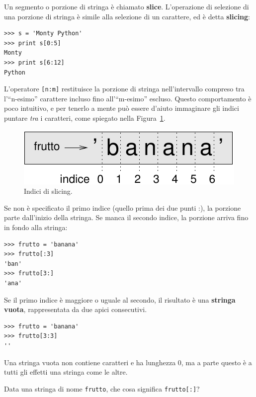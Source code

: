 \documentclass[10pt]{book}
\begin{document}
Un segmento o porzione di stringa è chiamato {\bf slice}. L'operazione di selezione di una porzione di stringa è simile alla selezione di un carattere, ed è detta {\bf slicing}:

\begin{verbatim}
>>> s = 'Monty Python'
>>> print s[0:5]
Monty
>>> print s[6:12]
Python
\end{verbatim}
%
L'operatore {\tt [n:m]} restituisce la porzione di stringa nell'intervallo compreso tra l'``n-esimo'' carattere incluso fino all'``m-esimo'' escluso. Questo comportamento è poco intuitivo, e per tenerlo a mente può essere d'aiuto immaginare gli indici puntare {\em tra} i caratteri, come spiegato nella Figura~\ref{fig.banana}.

\begin{figure}
\centerline
{\includegraphics[scale=0.8]{figs/banana.pdf}}
\caption{Indici di slicing.}
\label{fig.banana}
\end{figure}


Se non è specificato il primo indice (quello prima dei due punti :), la porzione parte dall'inizio della stringa. Se manca il secondo indice, la porzione arriva fino in fondo alla stringa:

\begin{verbatim}
>>> frutto = 'banana'
>>> frutto[:3]
'ban'
>>> frutto[3:]
'ana'
\end{verbatim}
%
Se il primo indice è maggiore o uguale al secondo, il risultato è una {\bf stringa vuota}, rappresentata da due apici consecutivi.

\begin{verbatim}
>>> frutto = 'banana'
>>> frutto[3:3]
''
\end{verbatim}
%
Una stringa vuota non contiene caratteri e ha lunghezza 0, ma a parte questo è a tutti gli effetti una stringa come le altre.

\vspace{0.2in}
\begin{exercise}

Data una stringa di nome {\tt frutto}, che cosa significa {\tt frutto[:]}?

\end{exercise}
\end{document}
